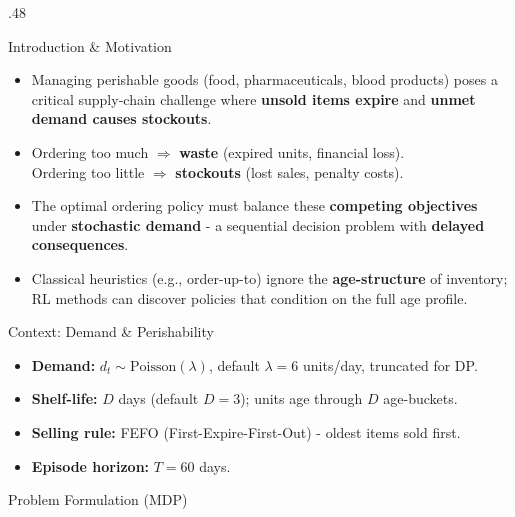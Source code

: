 \documentclass[final]{beamer}
\begin{document}
\begin{frame}[t]{}

\begin{columns}[T]

\begin{column}{.48\textwidth}

\begin{block}{Introduction \& Motivation}
\begin{itemize}
  \item Managing perishable goods (food, pharmaceuticals, blood products) poses a critical supply-chain challenge where \textbf{unsold items expire} and \textbf{unmet demand causes stockouts}.
  \item Ordering too much $\Rightarrow$ \textbf{waste} (expired units, financial loss).\\
        Ordering too little $\Rightarrow$ \textbf{stockouts} (lost sales, penalty costs).
  \item The optimal ordering policy must balance these \textbf{competing objectives} under \textbf{stochastic demand} - a sequential decision problem with \textbf{delayed consequences}.
  \item Classical heuristics (e.g., order-up-to) ignore the \textbf{age-structure} of inventory; RL methods can discover policies that condition on the full age profile.
\end{itemize}
\end{block}

\begin{block}{Context: Demand \& Perishability}
\begin{itemize}
  \item \textbf{Demand:} $d_t \sim \text{Poisson}(\lambda)$, default $\lambda = 6$ units/day, truncated for DP.
  \item \textbf{Shelf-life:} $D$ days (default $D=3$); units age through $D$ age-buckets.
  \item \textbf{Selling rule:} FEFO (First-Expire-First-Out) - oldest items sold first.
  \item \textbf{Episode horizon:} $T = 60$ days.
\end{itemize}
\end{block}

\begin{alertblock}{Problem Formulation (MDP)}


\end{alertblock}
\end{column}
\end{columns}
\end{frame}
\end{document}
